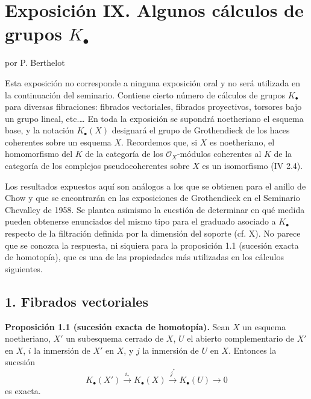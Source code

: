 \providecommand{\sisi}[2]{#2}

\section*{Exposición IX. Algunos cálculos de grupos $K_\bullet$}
\begin{center}
por P. Berthelot
\end{center}

Esta exposición no corresponde a ninguna exposición oral y no será utilizada en la continuación del seminario. Contiene cierto número de cálculos de grupos $K_\bullet$ para diversas fibraciones: fibrados vectoriales, fibrados proyectivos, torsores bajo un grupo lineal, etc.\ldots{} En toda la exposición se supondrá noetheriano el esquema base, y la notación $K_\bullet(X)$ designará el grupo de Grothendieck de los haces coherentes sobre un esquema $X$. Recordemos que, si $X$ es noetheriano, el homomorfismo del $K$ de la categoría de los $\mathcal O_X$-módulos coherentes al $K$ de la categoría de los complejos pseudocoherentes sobre $X$ es un isomorfismo (IV 2.4).

Los resultados expuestos aquí son análogos a los que se obtienen para el anillo de Chow y que se encontrarán en las exposiciones de Grothendieck en el Seminario Chevalley de 1958. Se plantea asimismo la cuestión de determinar en qué medida pueden obtenerse enunciados del mismo tipo para el graduado asociado a $K_\bullet$ respecto de la filtración definida por la dimensión del soporte (cf. X). No parece que se conozca la respuesta, ni siquiera para la proposición 1.1 (sucesión exacta de homotopía), que es una de las propiedades más utilizadas en los cálculos siguientes.

\subsection*{1. Fibrados vectoriales}

\textbf{Proposición 1.1 (sucesión exacta de homotopía).} Sean $X$ un esquema noetheriano, $X'$ un subesquema cerrado de $X$, $U$ el abierto complementario de $X'$ en $X$, $i$ la inmersión de $X'$ en $X$, y $j$ la inmersión de $U$ en $X$. Entonces la sucesión
\[
K_\bullet(X')\xrightarrow{i_*}K_\bullet(X)\xrightarrow{j^*}K_\bullet(U)\longrightarrow 0
\]
es exacta.

